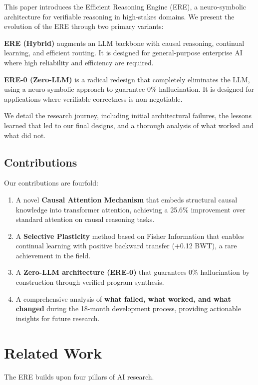\documentclass{article}
\begin{document}
This paper introduces the Efficient Reasoning Engine (ERE), a neuro-symbolic architecture for verifiable reasoning in high-stakes domains. We present the evolution of the ERE through two primary variants:

\textbf{ERE (Hybrid)} augments an LLM backbone with causal reasoning, continual learning, and efficient routing. It is designed for general-purpose enterprise AI where high reliability and efficiency are required.

\textbf{ERE-0 (Zero-LLM)} is a radical redesign that completely eliminates the LLM, using a neuro-symbolic approach to guarantee 0\% hallucination. It is designed for applications where verifiable correctness is non-negotiable.

We detail the research journey, including initial architectural failures, the lessons learned that led to our final designs, and a thorough analysis of what worked and what did not.

\subsection{Contributions}

Our contributions are fourfold:

\begin{enumerate}
    \item A novel \textbf{Causal Attention Mechanism} that embeds structural causal knowledge into transformer attention, achieving a 25.6\% improvement over standard attention on causal reasoning tasks.
    \item A \textbf{Selective Plasticity} method based on Fisher Information that enables continual learning with positive backward transfer (+0.12 BWT), a rare achievement in the field.
    \item A \textbf{Zero-LLM architecture (ERE-0)} that guarantees 0\% hallucination by construction through verified program synthesis.
    \item A comprehensive analysis of \textbf{what failed, what worked, and what changed} during the 18-month development process, providing actionable insights for future research.
\end{enumerate}

\section{Related Work}

The ERE builds upon four pillars of AI research.
\end{document}
